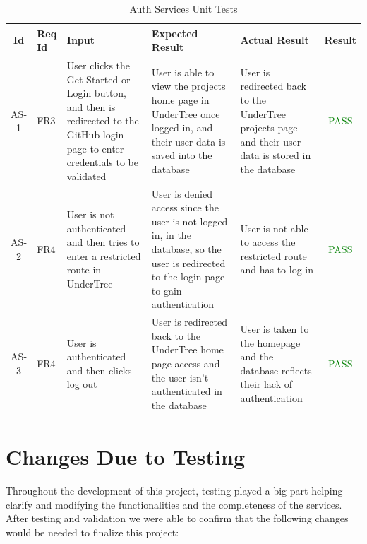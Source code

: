\documentclass[12pt, titlepage]{article}
\begin{document}
\begin{center}
    \begin{longtable}{|c|p{1cm}|p{2.7cm}|p{3cm}|p{3cm}|c|}
        \caption{Auth Services Unit Tests \label{long}}\\
        \hline
        \textbf{Id} & \textbf{Req Id} & \textbf{Input} & \textbf{Expected Result} & \textbf{Actual Result} & \textbf{Result}   \\
        \hline
        AS-1 & FR3 & User clicks the Get Started or Login button, and then is redirected to the GitHub login page to enter credentials to be validated & User is able to view the projects home page in UnderTree once logged in, and their user data is saved into the database & User is redirected back to the UnderTree projects page and their user data is stored in the database &  \textcolor{green}{PASS} \\
        \hline
        AS-2 & FR4 & User is not authenticated and then tries to enter a restricted route in UnderTree & User is denied access since the user is not logged in, in the database, so the user is redirected to the login page to gain authentication & User is not able to access the restricted route and has to log in & \textcolor{green}{PASS} \\
        \hline
        AS-3 & FR4 & User is authenticated and then clicks log out & User is redirected back to the UnderTree home page access and the user isn't authenticated in the database & User is taken to the homepage and the database reflects their lack of authentication & \textcolor{green}{PASS} \\
        \hline
    \end{longtable}
\end{center}
\section{Changes Due to Testing}


Throughout the development of this project, testing played a big part helping clarify and modifying the functionalities and the completeness of the services. After testing and validation we were able to confirm that the following changes would be needed to finalize this project:
\end{document}
